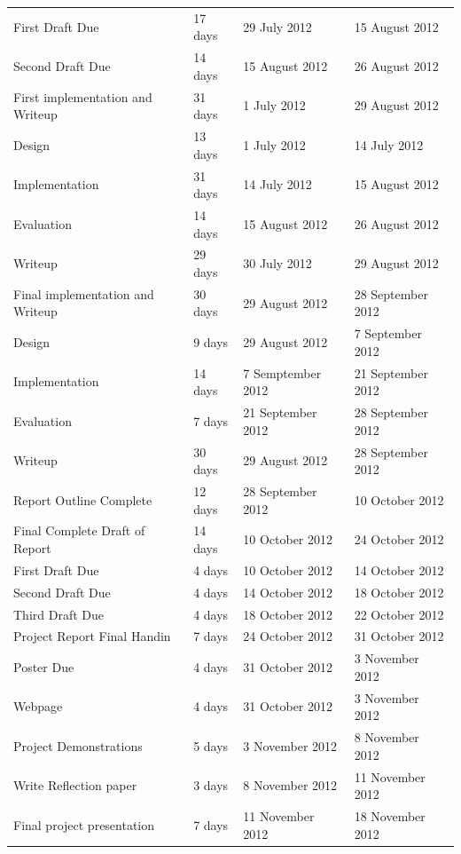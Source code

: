 \documentclass[12pt,a4paper]{article}
\begin{document}
\begin{tabular}{l||l|l|l}
    \indent First Draft Due & 17 days  & 29 July 2012 & 15 August 2012 \\
    \indent Second Draft Due & 14 days & 15 August 2012  & 26 August 2012 \\
    \hline
    First implementation and Writeup & 31 days & 1 July 2012 & 29 August 2012 \\
    \indent Design & 13 days & 1 July 2012 & 14 July 2012 \\
    \indent Implementation & 31 days & 14 July 2012 & 15 August 2012 \\
    \indent Evaluation & 14 days & 15 August 2012 & 26 August 2012  \\
    \indent Writeup & 29 days & 30 July 2012 & 29 August 2012 \\
    \hline
    Final implementation and Writeup & 30 days & 29 August 2012 & 28 September 2012 \\
    \indent Design & 9 days   & 29 August 2012  & 7 September 2012 \\
    \indent Implementation & 14 days & 7 Semptember 2012 & 21 September 2012 \\
    \indent Evaluation & 7 days & 21 September 2012  & 28 September 2012 \\
    \indent Writeup & 30 days & 29 August 2012 & 28 September 2012 \\
    \hline
    Report Outline Complete & 12 days  &28 September 2012 & 10 October 2012 \\
    \hline
    Final Complete Draft of Report & 14 days & 10 October 2012 & 24 October 2012 \\
    \indent First Draft Due & 4 days &10 October 2012 & 14 October 2012 \\
    \indent Second Draft Due & 4 days &14 October 2012 & 18 October 2012 \\
    \indent Third Draft Due & 4 days  &18 October 2012 & 22 October 2012 \\
    \hline
    Project Report Final Handin & 7 days & 24 October 2012 & 31 October 2012 \\
    \hline
    Poster Due & 4 days  & 31 October 2012 & 3 November 2012 \\
    \hline
    Webpage & 4 days & 31 October 2012 & 3 November 2012 \\
    \hline
    Project Demonstrations & 5 days & 3 November 2012 & 8 November 2012 \\
    \hline
    Write Reflection paper &3 days & 8 November 2012 & 11 November 2012 \\
    \hline
    Final project presentation & 7 days &11 November 2012 & 18 November 2012 \\

\end{tabular}
\end{document}

